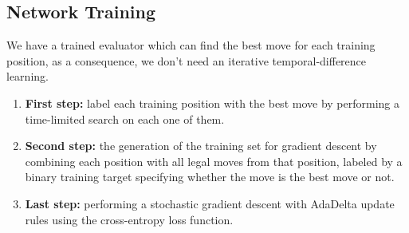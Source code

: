 		\subsection{Network Training}
			We have a trained evaluator which can find the best move for each training position, as a consequence, we don’t need an iterative temporal-difference learning.
			\begin{enumerate}
				\item \textbf{First step:}
					label each training position with the best move by
					performing a time-limited search on each one of them.
				\item \textbf{Second step:}
					the generation of the training set for gradient descent by combining each position with all legal moves from that position, labeled by a binary training target specifying whether the move is the best move or not.
				\item \textbf{Last step:}
					performing a stochastic gradient descent with AdaDelta update rules using the cross-entropy loss function.
			\end{enumerate}